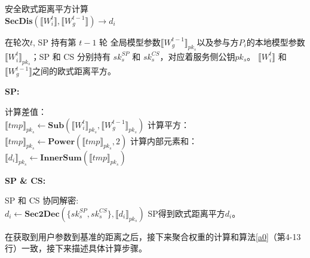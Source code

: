 \begin{algorithm}[htbp]
	\caption{安全欧式距离平方计算\\ \textbf{SecDis}$(\llbracket W_i^{t}\rrbracket, \llbracket W_g^{t-1}\rrbracket)\rightarrow d_i$}
	\label{a2}
	\begin{algorithmic}
		\REQUIRE 在轮次$t$, SP 持有第 $t-1$ 轮 全局模型参数$\llbracket W_g^{t-1} \rrbracket_{pk_s}$以及参与方$P_i$的本地模型参数 $\llbracket W_i^{t} \rrbracket_{pk_s}$；SP 和 CS 分别持有 $sk_{s}^{SP}$ 和 $sk_{s}^{CS}$，对应着服务侧公钥$pk_s$。
		\ENSURE $\llbracket W_i^{t}\rrbracket$ 和 $\llbracket W_g^{t-1}\rrbracket$之间的欧式距离平方。
	\end{algorithmic}
	\textbf{SP:}
	\begin{algorithmic}[1]
		\STATE 计算差值：\\$\llbracket tmp\rrbracket_{pk_s}\leftarrow {\textbf{Sub}}(\llbracket W_i^{t} \rrbracket_{pk_s}, \llbracket W_g^{t-1} \rrbracket_{pk_s})$
		\STATE 计算平方：\\$\llbracket tmp \rrbracket_{pk_s}\leftarrow {\textbf{Power}}(\llbracket tmp\rrbracket_{pk_s}, 2)$
		\STATE 计算内部元素和：\\$\llbracket d_i \rrbracket_{pk_s}\leftarrow {\textbf{InnerSum}}(\llbracket tmp \rrbracket_{pk_s})$
	\end{algorithmic}
	\textbf{SP \& CS:}
	\begin{algorithmic}[1]
		\STATE SP 和 CS 协同解密: \\ $d_i \leftarrow \textbf{Sec2Dec}(\{sk_{s}^{SP}, sk_{s}^{CS}\}, \llbracket d_i \rrbracket_{pk_s})$
		\RETURN SP得到欧式距离平方$d_i$。
	\end{algorithmic}
\end{algorithm}

在获取到用户参数到基准的距离之后，接下来聚合权重的计算和算法\ref{a0}（第4-13行）一致，接下来描述具体计算步骤。

